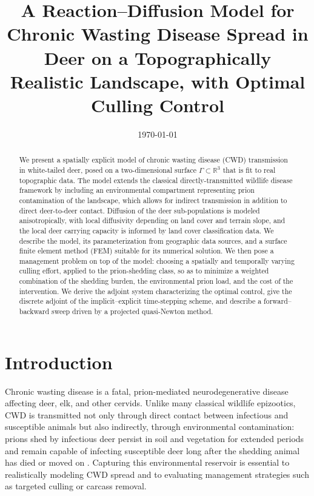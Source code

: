 \documentclass[11pt]{article}
\title{A Reaction--Diffusion Model for Chronic Wasting Disease Spread in Deer on a Topographically Realistic Landscape, with Optimal Culling Control}
\author{}
\date{\today}
\begin{document}
\maketitle

\begin{abstract}
We present a spatially explicit model of chronic wasting disease (CWD) transmission in white-tailed deer, posed on a two-dimensional surface $\Gamma \subset \mathbb{R}^3$ that is fit to real topographic data. The model extends the classical directly-transmitted wildlife disease framework by including an environmental compartment representing prion contamination of the landscape, which allows for indirect transmission in addition to direct deer-to-deer contact. Diffusion of the deer sub-populations is modeled anisotropically, with local diffusivity depending on land cover and terrain slope, and the local deer carrying capacity is informed by land cover classification data. We describe the model, its parameterization from geographic data sources, and a surface finite element method (FEM) suitable for its numerical solution. We then pose a management problem on top of the model: choosing a spatially and temporally varying culling effort, applied to the prion-shedding class, so as to minimize a weighted combination of the shedding burden, the environmental prion load, and the cost of the intervention. We derive the adjoint system characterizing the optimal control, give the discrete adjoint of the implicit--explicit time-stepping scheme, and describe a forward--backward sweep driven by a projected quasi-Newton method.
\end{abstract}

\section{Introduction}

Chronic wasting disease is a fatal, prion-mediated neurodegenerative disease affecting deer, elk, and other cervids. Unlike many classical wildlife epizootics, CWD is transmitted not only through direct contact between infectious and susceptible animals but also indirectly, through environmental contamination: prions shed by infectious deer persist in soil and vegetation for extended periods and remain capable of infecting susceptible deer long after the shedding animal has died or moved on \citep{Almberg2011}. Capturing this environmental reservoir is essential to realistically modeling CWD spread and to evaluating management strategies such as targeted culling or carcass removal.
\end{document}

